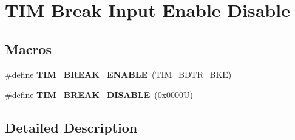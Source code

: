 \hypertarget{group___t_i_m___break___input__enable__disable}{}\section{T\+IM Break Input Enable Disable}
\label{group___t_i_m___break___input__enable__disable}
\subsection*{Macros}
\begin{DoxyCompactItemize}
\item 
\mbox{\label{group___t_i_m___break___input__enable__disable_ga3f966247b03532b8d93f9bddc032d863}} 
\#define {\bfseries T\+I\+M\+\_\+\+B\+R\+E\+A\+K\+\_\+\+E\+N\+A\+B\+LE}~(\hyperlink{group___peripheral___registers___bits___definition_ga74250b040dd9fd9c09dcc54cdd6d86d8}{T\+I\+M\+\_\+\+B\+D\+T\+R\+\_\+\+B\+KE})
\item 
\mbox{\label{group___t_i_m___break___input__enable__disable_ga8b34ce60f3f08c4b0d924a6546939994}} 
\#define {\bfseries T\+I\+M\+\_\+\+B\+R\+E\+A\+K\+\_\+\+D\+I\+S\+A\+B\+LE}~(0x0000\+U)
\end{DoxyCompactItemize}


\subsection{Detailed Description}
